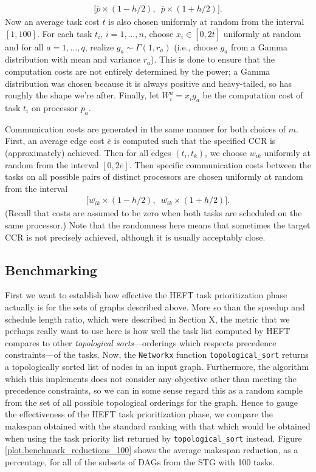 \documentclass[12pt]{article}
\begin{document}
\begin{align*}
\big[ \overline{p} \times (1 - h/2), \enspace \overline{p} \times (1 + h/2)     \big].
\end{align*}  
Now an average task cost $\overline{t}$ is also chosen uniformly at random from the interval $[1, 100]$. For each task $t_i$, $i = 1, \dots, n$, choose $x_i \in [0, 2\overline{t}]$ uniformly at random and for all $a = 1, \dots, q$, realize $g_a \sim \Gamma(1, r_a)$ (i.e., choose $g_a$ from a Gamma distribution with mean and variance $r_a$). This is done to ensure that the computation costs are not entirely determined by the power; a Gamma distribution was chosen because it is always positive and heavy-tailed, so has roughly the shape we're after.  Finally, let $W_i^a = x_i g_a$ be the computation cost of task $t_i$ on processor $p_a$. 

Communication costs are generated in the same manner for both choices of $m$. First, an average edge cost $\overline{e}$ is computed such that the specified CCR is (approximately) achieved. Then for all edges $(t_i, t_k)$, we choose $\overline{w_{ik}}$ uniformly at random from the interval $[0, 2\overline{e}]$. Then specific communication costs between the tasks on all possible pairs of distinct processors are chosen uniformly at random from the interval    
\begin{align*}
\big[ \overline{w_{ik}} \times (1 - h/2), \enspace \overline{w_{ik}} \times (1 + h/2)   \big].
\end{align*} 
(Recall that costs are assumed to be zero when both tasks are scheduled on the same processor.) Note that the randomness here means that sometimes the target CCR is not precisely achieved, although it is usually acceptably close.


\subsection{Benchmarking}
\label{subsect.benchmarking}

First we want to establish how effective the HEFT task prioritization phase actually is for the sets of graphs described above. More so than the speedup and schedule length ratio, which were described in Section X, the metric that we perhaps really want to use here is how well the task list computed by HEFT compares to other {\em topological sorts}---orderings which respects precedence constraints---of the tasks. Now, the {\tt Networkx} function {\tt topological\_sort} returns a topologically sorted list of nodes in an input graph. Furthermore, the algorithm which this implements does not consider any objective other than meeting the precedence constraints, so we can in some sense regard this as a random sample from the set of all possible topological orderings for the graph. Hence to gauge the effectiveness of the HEFT task prioritization phase, we compare the makespan obtained with the standard ranking with that which would be obtained when using the task priority list returned by {\tt topological\_sort} instead. Figure \ref{plot.benchmark_reductions_100} shows the average makespan reduction, as a percentage, for all of the subsets of DAGs from the STG with 100 tasks.
\end{document}
